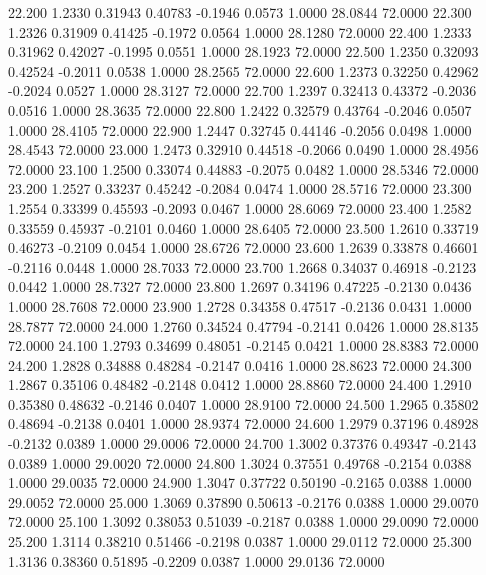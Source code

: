   22.200   1.2330   0.31943   0.40783  -0.1946   0.0573   1.0000  28.0844  72.0000
  22.300   1.2326   0.31909   0.41425  -0.1972   0.0564   1.0000  28.1280  72.0000
  22.400   1.2333   0.31962   0.42027  -0.1995   0.0551   1.0000  28.1923  72.0000
  22.500   1.2350   0.32093   0.42524  -0.2011   0.0538   1.0000  28.2565  72.0000
  22.600   1.2373   0.32250   0.42962  -0.2024   0.0527   1.0000  28.3127  72.0000
  22.700   1.2397   0.32413   0.43372  -0.2036   0.0516   1.0000  28.3635  72.0000
  22.800   1.2422   0.32579   0.43764  -0.2046   0.0507   1.0000  28.4105  72.0000
  22.900   1.2447   0.32745   0.44146  -0.2056   0.0498   1.0000  28.4543  72.0000
  23.000   1.2473   0.32910   0.44518  -0.2066   0.0490   1.0000  28.4956  72.0000
  23.100   1.2500   0.33074   0.44883  -0.2075   0.0482   1.0000  28.5346  72.0000
  23.200   1.2527   0.33237   0.45242  -0.2084   0.0474   1.0000  28.5716  72.0000
  23.300   1.2554   0.33399   0.45593  -0.2093   0.0467   1.0000  28.6069  72.0000
  23.400   1.2582   0.33559   0.45937  -0.2101   0.0460   1.0000  28.6405  72.0000
  23.500   1.2610   0.33719   0.46273  -0.2109   0.0454   1.0000  28.6726  72.0000
  23.600   1.2639   0.33878   0.46601  -0.2116   0.0448   1.0000  28.7033  72.0000
  23.700   1.2668   0.34037   0.46918  -0.2123   0.0442   1.0000  28.7327  72.0000
  23.800   1.2697   0.34196   0.47225  -0.2130   0.0436   1.0000  28.7608  72.0000
  23.900   1.2728   0.34358   0.47517  -0.2136   0.0431   1.0000  28.7877  72.0000
  24.000   1.2760   0.34524   0.47794  -0.2141   0.0426   1.0000  28.8135  72.0000
  24.100   1.2793   0.34699   0.48051  -0.2145   0.0421   1.0000  28.8383  72.0000
  24.200   1.2828   0.34888   0.48284  -0.2147   0.0416   1.0000  28.8623  72.0000
  24.300   1.2867   0.35106   0.48482  -0.2148   0.0412   1.0000  28.8860  72.0000
  24.400   1.2910   0.35380   0.48632  -0.2146   0.0407   1.0000  28.9100  72.0000
  24.500   1.2965   0.35802   0.48694  -0.2138   0.0401   1.0000  28.9374  72.0000
  24.600   1.2979   0.37196   0.48928  -0.2132   0.0389   1.0000  29.0006  72.0000
  24.700   1.3002   0.37376   0.49347  -0.2143   0.0389   1.0000  29.0020  72.0000
  24.800   1.3024   0.37551   0.49768  -0.2154   0.0388   1.0000  29.0035  72.0000
  24.900   1.3047   0.37722   0.50190  -0.2165   0.0388   1.0000  29.0052  72.0000
  25.000   1.3069   0.37890   0.50613  -0.2176   0.0388   1.0000  29.0070  72.0000
  25.100   1.3092   0.38053   0.51039  -0.2187   0.0388   1.0000  29.0090  72.0000
  25.200   1.3114   0.38210   0.51466  -0.2198   0.0387   1.0000  29.0112  72.0000
  25.300   1.3136   0.38360   0.51895  -0.2209   0.0387   1.0000  29.0136  72.0000
